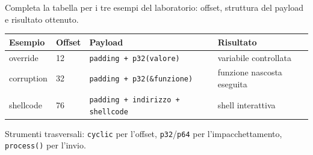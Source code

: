 \question[5]
Completa la tabella per i tre esempi del laboratorio: offset, struttura del payload e risultato ottenuto.
\begin{solution}
\begin{center}\small
\begin{tabular}{@{}llll@{}}
\toprule
Esempio & Offset & Payload & Risultato\\
\midrule
override   & 12 & \lstinline|padding + p32(valore)|          & variabile controllata\\
corruption & 32 & \lstinline|padding + p32(&funzione)|        & funzione nascosta eseguita\\
shellcode  & 76 & \lstinline|padding + indirizzo + shellcode| & shell interattiva\\
\bottomrule
\end{tabular}
\end{center}
Strumenti trasversali: \lstinline|cyclic| per l'offset, \lstinline|p32|/\lstinline|p64| per l'impacchettamento, \lstinline|process()| per l'invio.
\end{solution}
